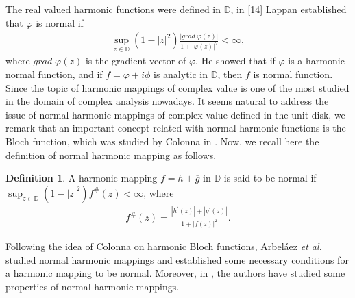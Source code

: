 \documentclass[a4paper,12pt]{amsart}
\theoremstyle{plain}
\theoremstyle{definition}
\newtheorem{defn}{Definition}[section]
\begin{document}
The real valued harmonic functions were defined in $\mathbb{D}$, in [14] Lappan established that $\varphi$ is normal if
\begin{align*}
	\sup_{z\in\mathbb{D}}(1-|z|^2) \frac{|grad\;\varphi(z)|}{1+ |\varphi(z)|^2}<\infty,
\end{align*}
where $grad\;\varphi(z)$ is the gradient vector of $\varphi$. He showed that if $\varphi$ is a harmonic normal function, and if $f=\varphi +i\phi$ is analytic in $\mathbb{D}$, then $f$ is normal function. Since the topic of harmonic mappings of complex value is one of the most studied in the domain of complex analysis nowadays. It seems natural to address the issue of normal harmonic mappings of complex value defined in the unit disk, we remark that an important concept related with normal harmonic functions is the Bloch function, which was studied by Colonna in \cite{Colonna-IUMJ-1989}. Now, we recall here the definition of normal harmonic mapping as follows.
\begin{defn}\cite{Arbe-Hern-MM-2019,Deng-Ponn-Qiao-MM-2020}
A harmonic mapping $ f=h+\overline{g} $ in $ \mathbb{D} $ is said to be normal if $\sup_{z\in\mathbb{D}}\left(1-|z|^2\right)f^{\#}(z)< \infty$, where 
\begin{align*}
	f^{\#}(z) = \frac{|h^{\prime}(z)|+ |g^{\prime}(z)|}{1 + |f(z)|^2}.
\end{align*} 
\end{defn}
Following the idea of Colonna \cite{Colonna-IUMJ-1989} on harmonic Bloch functions, Arbeláez \textit{et al.} \cite{Arbe-Hern-MM-2019} studied normal harmonic mappings and established some necessary conditions for a harmonic mapping to be normal. Moreover, in \cite{Deng-Ponn-Qiao-MM-2020,Ahamed-Mandal-MM-2023,Arbe-Hern-MM-2019}, the authors have studied some properties of normal harmonic mappings. \vspace{1.5mm}
\end{document}
